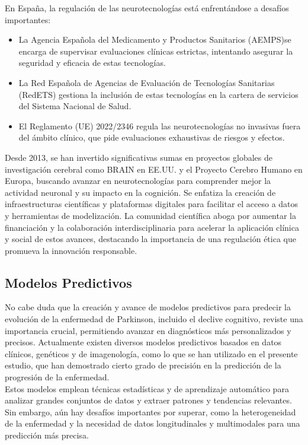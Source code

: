 En España, la regulación de las neurotecnologías está enfrentándose a desafíos importantes:
\begin{itemize}
	\item La Agencia Española del Medicamento y Productos Sanitarios (AEMPS)se encarga de supervisar evaluaciones clínicas estrictas, intentando asegurar la seguridad y eficacia de estas tecnologías.
	\item La Red Española de Agencias de Evaluación de Tecnologías Sanitarias (RedETS) gestiona la inclusión de estas tecnologías en la cartera de servicios del Sistema Nacional de Salud.
	\item El Reglamento (UE) 2022/2346 regula las neurotecnologías no invasivas fuera del ámbito clínico, que pide evaluaciones exhaustivas de riesgos y efectos.
\end{itemize}

Desde 2013, se han invertido significativas sumas en proyectos globales de investigación cerebral como BRAIN en EE.UU. y el Proyecto Cerebro Humano en Europa, buscando avanzar en neurotecnologías para comprender mejor la actividad neuronal y su impacto en la cognición. Se enfatiza la creación de infraestructuras científicas y plataformas digitales para facilitar el acceso a datos y herramientas de modelización. La comunidad científica aboga por aumentar la financiación y la colaboración interdisciplinaria para acelerar la aplicación clínica y social de estos avances, destacando la importancia de una regulación ética que promueva la innovación responsable.\\


\subsection{Modelos Predictivos}
No cabe duda que la creación y avance de modelos predictivos para predecir la evolución de la enfermedad de Parkinson, incluido el declive cognitivo, reviste una importancia crucial, permitiendo avanzar en diagnósticos más personalizados y precisos. Actualmente existen diversos modelos predictivos basados en datos clínicos, genéticos y de imagenología, como lo que se han utilizado en el presente estudio, que han demostrado cierto grado de precisión en la predicción de la progresión de la enfermedad.\\

Estos modelos emplean técnicas estadísticas y de aprendizaje automático para analizar grandes conjuntos de datos y extraer patrones y tendencias relevantes. Sin embargo, aún hay desafíos importantes por superar, como la heterogeneidad de la enfermedad y la necesidad de datos longitudinales y multimodales para una predicción más precisa. \cite{Predicti52:online}\\

